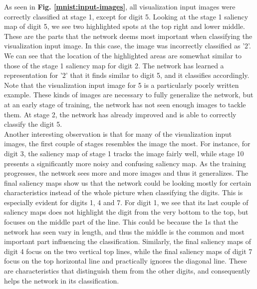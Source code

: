 \noindent As seen in \textbf{Fig. \ref{mnist:input-images}}, all visualization input images were correctly classified at stage 1, except for digit 5. Looking at the stage 1 saliency map of digit 5, we see two highlighted spots at the top right and lower middle. These are the parts that the network deems most important when classifying the visualization input image. In this case, the image was incorrectly classified as '2'. We can see that the location of the highlighted areas are somewhat similar to those of the stage 1 saliency map for digit 2. The network has learned a representation for '2' that it finds similar to digit 5, and it classifies accordingly. Note that the visualization input image for 5 is a particularly poorly written example. These kinds of images are necessary to fully generalize the network, but at an early stage of training, the network has not seen enough images to tackle them. At stage 2, the network has already improved and is able to correctly classify the digit 5. \\

\noindent Another interesting observation is that for many of the visualization input images, the first couple of stages resembles the image the most. For instance, for digit 3, the saliency map of stage 1 tracks the image fairly well, while stage 10 presents a significantly more noisy and confusing saliency map. As the training progresses, the network sees more and more images and thus it generalizes. The final saliency maps show us that the network could be looking mostly for certain characteristics instead of the whole picture when classifying the digits. This is especially evident for digits 1, 4 and 7. For digit 1, we see that its last couple of saliency maps does not highlight the digit from the very bottom to the top, but focuses on the middle part of the line. This could be because the 1s that the network has seen vary in length, and thus the middle is the common and most important part influencing the classification. Similarly, the final saliency maps of digit 4 focus on the two vertical top lines, while the final saliency maps of digit 7 focus on the top horizontal line and practically ignores the diagonal line. These are characteristics that distinguish them from the other digits, and consequently helps the network in its classification. \\

